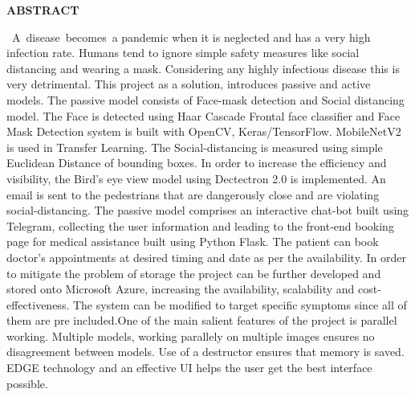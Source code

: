 \documentclass[12pt]{article}
\begin{document}
\begin{Center}
\textbf{ABSTRACT}
\end{Center}
\setlength{\parskip}{0.0pt}
\begin{justify}
{\fontsize{10pt}{12.0pt}\selectfont \  }A\ disease\ becomes\ a pandemic when it is neglected and has a very high infection rate.  Humans tend to ignore simple safety measures like social distancing and wearing a mask. Considering any highly infectious disease this is very detrimental. This project as a solution, introduces passive and active models. The passive model consists of Face-mask detection and Social distancing model. The Face is detected using Haar Cascade Frontal face classifier and Face Mask Detection system is built with OpenCV, Keras/TensorFlow. MobileNetV2 is used in Transfer Learning. The Social-distancing is measured using simple Euclidean Distance of bounding boxes. In order to increase the efficiency and visibility, the Bird’s eye view model using Dectectron 2.0 is implemented.  An email is sent to the pedestrians that are dangerously close and are violating social-distancing. The passive model comprises an interactive chat-bot built using Telegram, collecting the user information and leading to the front-end booking page for medical assistance built using Python Flask. The patient can book doctor’s appointments at desired timing and date as per the availability.  In order to mitigate the problem of storage the project can be further developed and stored onto Microsoft Azure, increasing the availability, scalability and cost-effectiveness. The system can be modified to target specific symptoms since all of them are pre included.One of the main salient features of the project is parallel working. Multiple models, working parallely on multiple images ensures no disagreement between models. Use of a destructor ensures that memory is saved. EDGE technology and an effective UI helps the user get the best interface possible.
\end{justify}

\vspace{\baselineskip}
\vspace{\baselineskip}
\vspace{\baselineskip}
\vspace{\baselineskip}
\vspace{\baselineskip}
\vspace{\baselineskip}
\vspace{\baselineskip}
\vspace{\baselineskip}
\vspace{\baselineskip}
\vspace{\baselineskip}
\vspace{\baselineskip}
\end{document}
